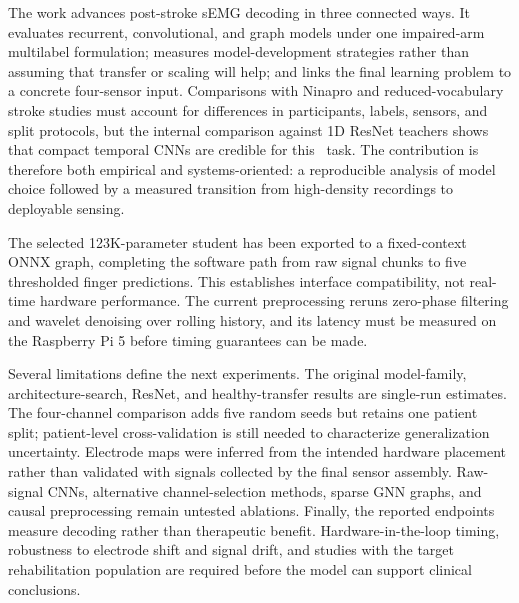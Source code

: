 The work advances post-stroke sEMG decoding in three connected ways. It evaluates recurrent, convolutional, and graph models under one impaired-arm multilabel formulation; measures model-development strategies rather than assuming that transfer or scaling will help; and links the final learning problem to a concrete four-sensor input. Comparisons with Ninapro and reduced-vocabulary stroke studies must account for differences in participants, labels, sensors, and split protocols, but the internal comparison against 1D ResNet teachers shows that compact temporal CNNs are credible for this \physiomio\ task. The contribution is therefore both empirical and systems-oriented: a reproducible analysis of model choice followed by a measured transition from high-density recordings to deployable sensing.

The selected 123K-parameter student has been exported to a fixed-context ONNX graph, completing the software path from raw signal chunks to five thresholded finger predictions. This establishes interface compatibility, not real-time hardware performance. The current preprocessing reruns zero-phase filtering and wavelet denoising over rolling history, and its latency must be measured on the Raspberry Pi 5 before timing guarantees can be made.

Several limitations define the next experiments. The original model-family, architecture-search, ResNet, and healthy-transfer results are single-run estimates. The four-channel comparison adds five random seeds but retains one patient split; patient-level cross-validation is still needed to characterize generalization uncertainty. Electrode maps were inferred from the intended hardware placement rather than validated with signals collected by the final sensor assembly. Raw-signal CNNs, alternative channel-selection methods, sparse GNN graphs, and causal preprocessing remain untested ablations. Finally, the reported endpoints measure decoding rather than therapeutic benefit. Hardware-in-the-loop timing, robustness to electrode shift and signal drift, and studies with the target rehabilitation population are required before the model can support clinical conclusions.
